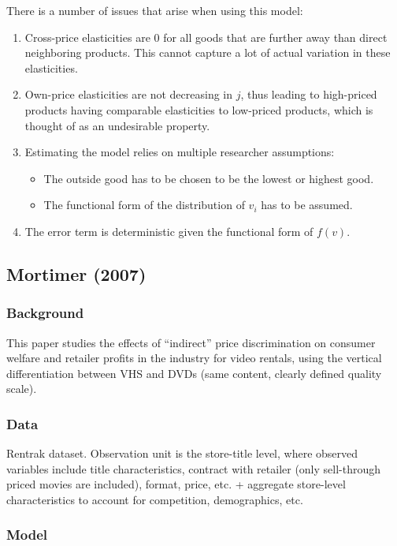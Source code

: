 There is a number of issues that arise when using this model:\begin{enumerate}
\item Cross-price elasticities are 0 for all goods that are further away than direct neighboring products. This cannot capture a lot of actual variation in these elasticities.
\item Own-price elasticities are not decreasing in $j$, thus leading to high-priced products having comparable elasticities to low-priced products, which is thought of as an undesirable property.
\item Estimating the model relies on multiple researcher assumptions:\begin{itemize}
\item The outside good has to be chosen to be the lowest or highest good.
\item The functional form of the distribution of $v_i$ has to be assumed.
\end{itemize}
\item The error term is deterministic given the functional form of $f(v)$.
\end{enumerate}

\subsection{Mortimer (2007)}

\subsubsection{Background}

This paper studies the effects of ``indirect'' price discrimination on consumer welfare and retailer profits in the industry for video rentals, using the vertical differentiation between VHS and DVDs (same content, clearly defined quality scale). 

\subsubsection{Data}

Rentrak dataset. Observation unit is the store-title level, where observed variables include title characteristics, contract with retailer (only sell-through priced movies are included), format, price, etc. + aggregate store-level characteristics to account for competition, demographics, etc.

\subsubsection{Model}

